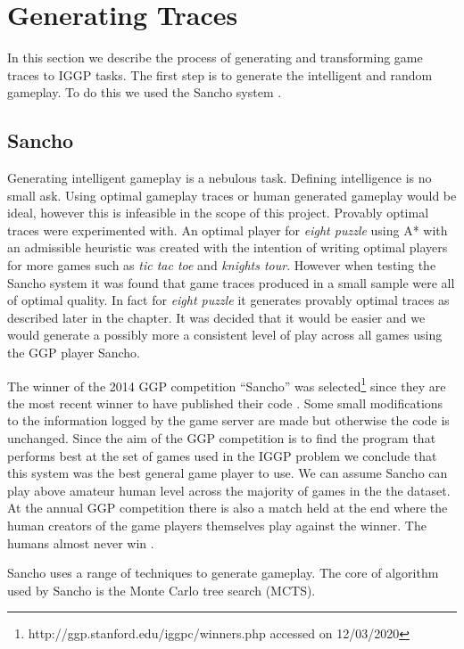 \chapter{Generating Traces}\label{ch:traces}
In this section we describe the process of generating and transforming game traces to IGGP tasks. The first step is to generate the intelligent and random gameplay. To do this we used the Sancho system \cite{Sancho/Github}.

\section{Sancho}\label{sec:sancho}
Generating intelligent gameplay is a nebulous task. Defining intelligence is no small ask. Using optimal gameplay traces or human generated gameplay would be ideal, however this is infeasible in the scope of this project. Provably optimal traces were experimented with. An optimal player for \textit{eight puzzle} using A* with an admissible heuristic was created with the intention of writing optimal players for more games such as \textit{tic tac toe} and \textit{knights tour}. However when testing the Sancho system it was found that game traces produced in a small sample were all of optimal quality. In fact for \textit{eight puzzle} it generates provably optimal traces as described later in the chapter. It was decided that it would be easier and we would generate a possibly more a consistent level of play across all games using the GGP player Sancho.

The winner of the 2014 GGP competition ``Sancho'' was selected\footnote{http://ggp.stanford.edu/iggpc/winners.php accessed on 12/03/2020} since they are the most recent winner to have published their code \cite{Sancho/Github}. Some small modifications to the information logged by the game server are made but otherwise the code is unchanged. Since the aim of the GGP competition is to find the program that performs best at the set of games used in the IGGP problem we conclude that this system was the best general game player to use. We can assume Sancho can play above amateur human level across the majority of games in the the dataset. At the annual GGP competition there is also a match held at the end where the human creators of the game players themselves play against the winner. The humans almost never win \cite{Genesereth/GGPOverview}.

Sancho uses a range of techniques to generate gameplay. The core of algorithm used by Sancho is the Monte Carlo tree search (MCTS).

